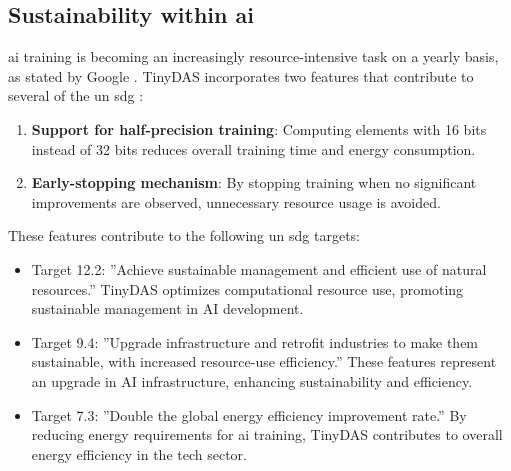 \subsection{Sustainability within \acrshort{ai}}
\acrshort{ai} training is becoming an increasingly resource-intensive task on a yearly basis, as stated by Google \cite{9499913}. TinyDAS incorporates two features that contribute to several of the \acrfull{un} \acrfull{sdg} \cite{UNSDGs}:
\begin{enumerate}
\item \textbf{Support for half-precision training}: Computing elements with 16 bits instead of 32 bits reduces overall training time and energy consumption.
\item \textbf{Early-stopping mechanism}: By stopping training when no significant improvements are observed, unnecessary resource usage is avoided.
\end{enumerate}
These features contribute to the following \acrshort{un} \acrshort{sdg} targets:
\begin{itemize}
\item Target 12.2: ''Achieve sustainable management and efficient use of natural resources.'' TinyDAS optimizes computational resource use, promoting sustainable management in AI development.
\item Target 9.4: ''Upgrade infrastructure and retrofit industries to make them sustainable, with increased resource-use efficiency.'' These features represent an upgrade in AI infrastructure, enhancing sustainability and efficiency.
\item Target 7.3: ''Double the global energy efficiency improvement rate.'' By reducing energy requirements for \acrshort{ai} training, TinyDAS contributes to overall energy efficiency in the tech sector.
\end{itemize}